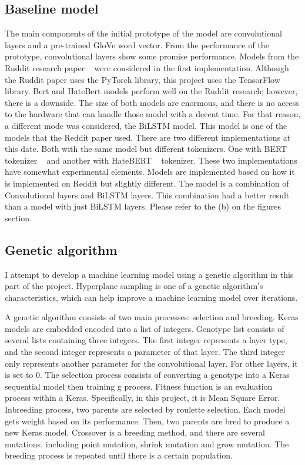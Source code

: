 \documentclass[11pt, natbib=false]{article}
\begin{document}
\begin{multicols}{2}
\subsection{Baseline model}
The main components of the initial prototype of the model are convolutional layers and a pre-trained GloVe word vector. From the performance of the prototype, convolutional layers show some promise performance.
Models from the Ruddit research paper ~\cite{hada2021ruddit} were considered in the first implementation. Although the Ruddit paper uses the PyTorch library, this project uses the TensorFlow library.
Bert and HateBert models perform well on the Ruddit research; however, there is a downside.
The size of both models are enormous, and there is no access to the hardware that can handle those model with a decent time. For that reason, a different mode was considered, the BiLSTM model.
This model is one of the models that the Reddit paper used. There are two different implementations at this date.
Both with the same model but different tokenizers.
One with BERT tokenizer ~\cite{devlin2018bert} and another with HateBERT ~\cite{caselli2020hatebert} tokenizer.
These two implementations have somewhat experimental elements.
Models are implemented based on how it is implemented on Reddit but slightly different.
The model is a combination of Convolutional layers and BiLSTM layers.
This combination had a better result than a model with just BiLSTM layers.
Please refer to the (b) on the figures section.

\subsection{Genetic algorithm}
I attempt to develop a machine learning model using a genetic algorithm in this part of the project.
Hyperplane sampling is one of a genetic algorithm's characteristics, which can help improve a machine learning model over iterations.

A genetic algorithm consists of two main processes: selection and breeding.
Keras models are embedded encoded into a list of integers.
Genotype list consists of several lists containing three integers.
The first integer represents a layer type, and the second integer represents a parameter of that layer.
The third integer only represents another parameter for the convolutional layer.
For other layers, it is set to 0.
The selection process consists of converting a genotype into a Keras sequential model then training g process.
Fitness function is an evaluation process within a Keras.
Specifically, in this project, it is Mean Square Error.
Inbreeding process, two parents are selected by roulette selection.
Each model gets weight based on its performance.
Then, two parents are bred to produce a new Keras model.
Crossover is a breeding method, and there are several mutations, including point mutation, shrink mutation and grow mutation.
The breeding process is repeated until there is a certain population.


\end{multicols}
\end{document}
